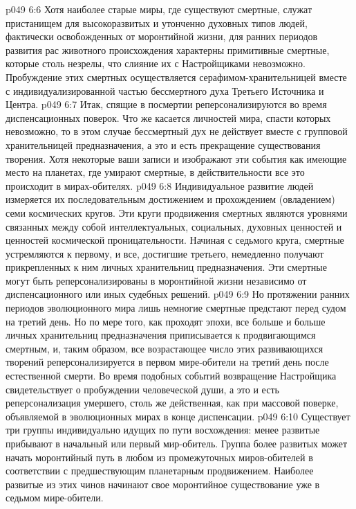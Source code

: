 \vs p049 6:6 Хотя наиболее старые миры, где существуют смертные, служат пристанищем для высокоразвитых и утонченно духовных типов людей, фактически освобожденных от моронтийной жизни, для ранних периодов развития рас животного происхождения характерны примитивные смертные, которые столь незрелы, что слияние их с Настройщиками невозможно. Пробуждение этих смертных осуществляется серафимом\hyp{}хранительницей вместе с индивидуализированной частью бессмертного духа Третьего Источника и Центра.
\vs p049 6:7 Итак, спящие в посмертии реперсонализируются во время диспенсационных поверок. Что же касается личностей мира, спасти которых невозможно, то в этом случае бессмертный дух не действует вместе с групповой хранительницей предназначения, а это и есть прекращение существования творения. Хотя некоторые ваши записи и изображают эти события как имеющие место на планетах, где умирают смертные, в действительности все это происходит в мирах\hyp{}обителях.
\vs p049 6:8 \pc {}\bibnobreakspace {} Индивидуальное развитие людей измеряется их последовательным достижением и прохождением (овладением) семи космических кругов. Эти круги продвижения смертных являются уровнями связанных между собой интеллектуальных, социальных, духовных ценностей и ценностей космической проницательности. Начиная с седьмого круга, смертные устремляются к первому, и все, достигшие третьего, немедленно получают прикрепленных к ним личных хранительниц предназначения. Эти смертные могут быть реперсонализированы в моронтийной жизни независимо от диспенсационного или иных судебных решений.
\vs p049 6:9 Но протяжении ранних периодов эволюционного мира лишь немногие смертные предстают перед судом на третий день. Но по мере того, как проходят эпохи, все больше и больше личных хранительниц предназначения приписывается к продвигающимся смертным, и, таким образом, все возрастающее число этих развивающихся творений реперсонализируется в первом мире\hyp{}обители на третий день после естественной смерти. Во время подобных событий возвращение Настройщика свидетельствует о пробуждении человеческой души, а это и есть реперсонализация умершего, столь же действенная, как при массовой поверке, объявляемой в эволюционных мирах в конце диспенсации.
\vs p049 6:10 Существует три группы индивидуально идущих по пути восхождения: менее развитые прибывают в начальный или первый мир\hyp{}обитель. Группа более развитых может начать моронтийный путь в любом из промежуточных миров\hyp{}обителей в соответствии с предшествующим планетарным продвижением. Наиболее развитые из этих чинов начинают свое моронтийное существование уже в седьмом мире\hyp{}обители.
